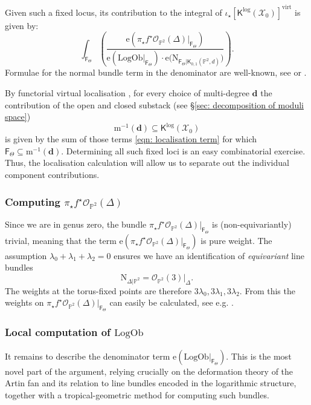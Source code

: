 \documentclass[11pt]{amsart}
\theoremstyle{definition}
\theoremstyle{definition}
\newcommand{\op}[1]{\operatorname{#1}}
\newcommand{\PP}{\mathbb{P}}
\newcommand{\OO}{\mathcal{O}}
\newcommand{\virt}{\op{virt}}
\newcommand{\Norm}{\mathrm{N}}
\newcommand{\LogOb}{\mathrm{LogOb}}
\newcommand{\Euler}{\mathrm{e}}
\newcommand{\Xcal}{\mathcal{X}}
\newcommand{\Kup}{\mathsf{K}}
\newcommand{\Fup}{\mathsf{F}}
\begin{document}
Given such a fixed locus, its contribution to the integral of $\iota_\star[\Kup^{\log}(\Xcal_0)]^{\virt}$ is given by:
\begin{equation}\label{eqn: localisation term}
\int_{\Fup_{\Theta}} \left( \dfrac{\Euler(\pi_\star f^\star \OO_{\PP^2}(\Delta)|_{\Fup_{\Theta}})}{\Euler(\LogOb|_{\Fup_{\Theta}})\cdot \Euler\big(\Norm_{\Fup_{\Theta}|\Kup_{0,1}(\PP^2,d)}\big)} \right).
\end{equation}
Formulae for the normal bundle term in the denominator are well-known, see \cite[\S 4]{GraberPandharipande} or \cite[Theorem~9.2.1]{CoxKatz}.

By functorial virtual localisation \cite[Lemma 2.1]{LLY3}, for every choice of multi-degree $\mathbf{d}$ the contribution of the open and closed substack (see \S \ref{sec: decomposition of moduli space})
\begin{equation*} \mathrm{m}^{-1}(\mathbf{d}) \subseteq \Kup^{\log}(\Xcal_0) \end{equation*}
is given by the sum of those terms \eqref{eqn: localisation term} for which $\Fup_\Theta \subseteq \mathrm{m}^{-1}(\mathbf{d})$. Determining all such fixed loci is an easy combinatorial exercise. Thus, the localisation calculation will allow us to separate out the individual component contributions.

\subsubsection{Computing $\pi_\star f^\star \OO_{\PP^2}(\Delta)$}\label{subsection computing numerator}
Since we are in genus zero, the bundle $\pi_\star f^\star \OO_{\PP^2}(\Delta)|_{\Fup_{\Theta}}$ is (non-equivariantly) trivial, meaning that the term $\Euler(\pi_\star f^\star \OO_{\PP^2}(\Delta)|_{\Fup_{\Theta}})$ is pure weight. The assumption $\lambda_0+\lambda_1+\lambda_2=0$ ensures we have an identification of \emph{equivariant} line bundles
\begin{equation*} \mathrm{N}_{\Delta|\PP^2}=\OO_{\PP^2}(3)|_{\Delta}.\end{equation*}
The weights at the torus-fixed points are therefore $3\lambda_0,3\lambda_1,3\lambda_2$. From this the weights on $\pi_\star f^\star \OO_{\PP^2}(\Delta)|_{\Fup_{\Theta}}$ can easily be calculated, see e.g. \cite[\S 4]{GraberPandharipande}.

\subsubsection{Local computation of $\mathrm{LogOb}$} \label{subsection computing LogOb}\label{sec: computing LogOb} It remains to describe the denominator term $\Euler(\LogOb|_{\Fup_{\Theta}})$. This is the most novel part of the argument, relying crucially on the deformation theory of the Artin fan and its relation to line bundles encoded in the logarithmic structure, together with a tropical-geometric method for computing such bundles.
\end{document}
